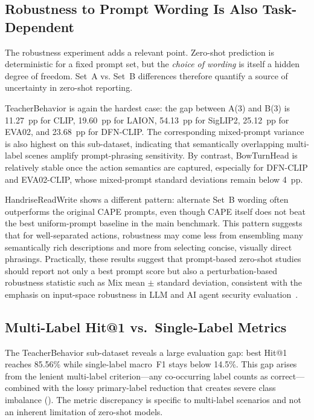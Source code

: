 \documentclass[symmetry,article,submit,pdftex,moreauthors]{Definitions/mdpi}
\begin{document}
\subsection{Robustness to Prompt Wording Is Also Task-Dependent}

The robustness experiment adds a relevant point. Zero-shot prediction is deterministic for a fixed prompt set, but the \emph{choice of wording} is itself a hidden degree of freedom. Set~A vs. Set~B differences therefore quantify a source of uncertainty in zero-shot reporting.

TeacherBehavior is again the hardest case: the gap between A(3) and B(3) is 11.27~pp for CLIP, 19.60~pp for LAION, 54.13~pp for SigLIP2, 25.12~pp for EVA02, and 23.68~pp for DFN-CLIP. The corresponding mixed-prompt variance is also highest on this sub-dataset, indicating that semantically overlapping multi-label scenes amplify prompt-phrasing sensitivity. By contrast, BowTurnHead is relatively stable once the action semantics are captured, especially for DFN-CLIP and EVA02-CLIP, whose mixed-prompt standard deviations remain below 4~pp.

HandriseReadWrite shows a different pattern: alternate Set~B wording often outperforms the original CAPE prompts, even though CAPE itself does not beat the best uniform-prompt baseline in the main benchmark. This pattern suggests that for well-separated actions, robustness may come less from ensembling many semantically rich descriptions and more from selecting concise, visually direct phrasings. Practically, these results suggest that prompt-based zero-shot studies should report not only a best prompt score but also a perturbation-based robustness statistic such as Mix mean $\pm$ standard deviation, consistent with the emphasis on input-space robustness in LLM and AI agent security evaluation~\cite{zhou2025security_llm,deng2025ai_agents}.

\subsection{Multi-Label Hit@1 vs.\ Single-Label Metrics}
\label{sec:metric_gap}

The TeacherBehavior sub-dataset reveals a large evaluation gap: best Hit@1 reaches 85.56\% while single-label macro~F1 stays below 14.5\%.
This gap arises from the lenient multi-label criterion---any co-occurring label counts as correct---combined with the lossy primary-label reduction that creates severe class imbalance (). The metric discrepancy is specific to multi-label scenarios and not an inherent limitation of zero-shot models.
\end{document}
